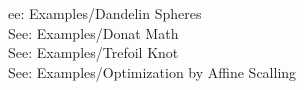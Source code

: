 \documentclass{article}
\begin{document}
\begin{eulernotebook}
\begin{eulercomment}
ee: Examples/Dandelin Spheres\\
See: Examples/Donat Math\\
See: Examples/Trefoil Knot\\
See: Examples/Optimization by Affine Scalling
\end{eulercomment}
\end{eulernotebook}
\end{document}
